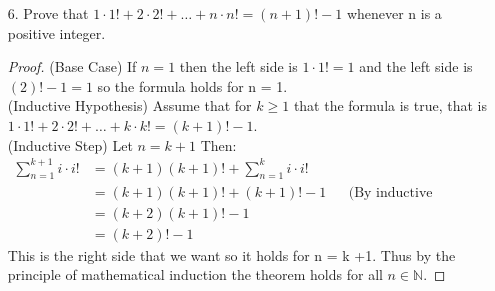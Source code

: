 \begin{itemize}
    \item[6.]  Prove that $1 \cdot 1! + 2 \cdot 2! + \ldots + n \cdot n! = (n + 1)! - 1$ whenever n is a positive integer. \\
          \answer
          \begin{proof}
              (Base Case) If $n=1$ then the left side is $1 \cdot 1! = 1$ and the left side is $(2)! - 1=1$ so the formula holds for n = 1.\\
              (Inductive Hypothesis) Assume that for $k \geq 1$ that the formula is true, that is $1 \cdot 1! + 2 \cdot 2! + \ldots + k \cdot k! = (k + 1)! - 1$. \\
              (Inductive Step) Let $n = k + 1$ Then:
              \begin{align*}
                  \sum_{n=1}^{k+1} i \cdot i! & = (k+1)(k+1)! + \sum_{n=1}^{k} i \cdot i!                                       \\
                                              & = (k+1)(k+1)! + (k+1)! -1                 &  & \text{(By inductive hypothesis)} \\
                                              & = (k+2)(k+1)! -1                                                                \\
                                              & = (k+2)! - 1
              \end{align*}
              This is the right side that we want so it holds for n = k +1. Thus by the principle of mathematical induction the theorem holds for all $n \in \mathbb{N}$.
          \end{proof}
\end{itemize}


